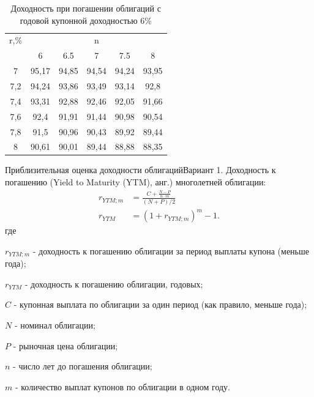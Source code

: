 \documentclass[_DKB_p1_Money.tex]{subfiles}
\begin{document}
\begin{frame}[shrink=15]
\begin{table}[htbp]
	\caption{Доходность при погашении облигаций с годовой купонной доходностью 6\%}
  \centering
    \begin{tabular}{cccccc}
    	\toprule
    	       r,\%        &         \multicolumn{5}{c}{n}         \\
    	\cmidrule(lr){2-6} &   6   &  6.5  &   7   &  7.5  &   8   \\ \midrule
    	        7          & 95,17 & 94,85 & 94,54 & 94,24 & 93,95 \\
    	       7,2         & 94,24 & 93,86 & 93,49 & 93,14 & 92,8  \\
    	       7,4         & 93,31 & 92,88 & 92,46 & 92,05 & 91,66 \\
    	       7,6         & 92,4  & 91,91 & 91,44 & 90,98 & 90,54 \\
    	       7,8         & 91,5  & 90,96 & 90,43 & 89,92 & 89,44 \\
    	        8          & 90,61 & 90,01 & 89,44 & 88,88 & 88,35 \\ \bottomrule
    \end{tabular}%
  \label{tab:addlabel}%
\end{table}%

\end{frame}

\begin{frame}[shrink=20]{Приблизительная оценка доходности облигаций}{Вариант 1.}
Доходность к погашению (Yield to Maturity (YTM), анг.) многолетней облигации:
\begin{align}
r_{YTM;m}&=\frac{C+\frac{N-P}{n\cdot m}}{(N+P)/2}\\
r_{YTM}&=(1+r_{YTM;m})^m-1.
\end{align}
где

$r_{YTM;m}$ - доходность к погашению облигации за период выплаты купона (меньше года);

$r_{YTM}$ - доходность к погашению облигации, годовых;

$C$ - купонная выплата по облигации за один период (как правило, меньше года);

$N$ - номинал облигации;

$P$ - рыночная цена облигации;

$n$ - число лет до погашения облигации;

$m$ - количество выплат купонов по облигации в одном году.

\end{frame}
\end{document}
